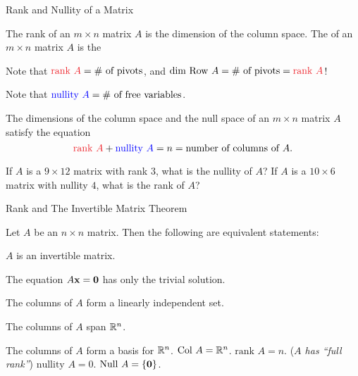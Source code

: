 \documentclass[xcolor=dvipsnames,aspectratio=169,t]{beamer}
\begin{document}
\begin{frame}{Rank and Nullity of a Matrix}

\bbox
\bi 
\ii The \alert{rank} of an $m \times n$ matrix $A$ is the \alert{dimension of the column space.}
\ii The  of an $m \times n$ matrix $A$ is the 
\ei
\ebox
\smallskip

\pause 
Note that $\colorr{\mbox{rank }A}=\text{\# of pivots}$, 
\pause
and $\dim\ \Row A=\text{\# of pivots}=\colorr{\mbox{rank }A}$! 
\medskip

\pause
Note that $\textcolor{blue}{\mbox{nullity }A}=\text{\# of free variables}$.



\pause
\begin{theorem}
The dimensions of the column space and the null space of an $m \times n$ matrix $A$ satisfy the equation
\[ \colorr{\mbox{rank $A$}} + \colorb{\mbox{nullity $A$}} = n = \mbox{number of columns of $A$}. \]
\end{theorem}
\smallskip

\pause
\bb
\ii If $A$ is a $9 \times 12$ matrix with rank $3$, what is the nullity of $A$?
\ii If $A$ is a $10 \times 6$ matrix with nullity $4$, what is the rank of $A$?
\ee

\end{frame}


\begin{frame}{Rank and The Invertible Matrix Theorem}
  \begin{theorem}
  Let $A$ be an $n \times n$ matrix. Then the following are equivalent statements:

  \bb[(a)]
  \ii $A$ is an invertible matrix.
  \addtocounter{enumi}{2}
  \item The equation $A\mathbf{x}=\mathbf{0}$ has only the trivial solution.
  \item The columns of $A$ form a linearly independent set.
  \addtocounter{enumi}{2}
  \item The columns of $A$ span $\mathbb{R}^n$.
  \addtocounter{enumi}{5}
  \ii The columns of $A$ form a \alert{basis} for $\mathbb{R}^n$.
  \ii $\mbox{Col } A = \mathbb{R}^n$.
  \ii $\mbox{rank } A = n$. (\emph{$A$ has ``full rank''})
  \ii $\mbox{nullity } A = 0$.
  \ii $\mbox{Null } A = \left\{ \mathbf{0} \right\}$.
  \ee
  \end{theorem}
\end{frame}
\end{document}

